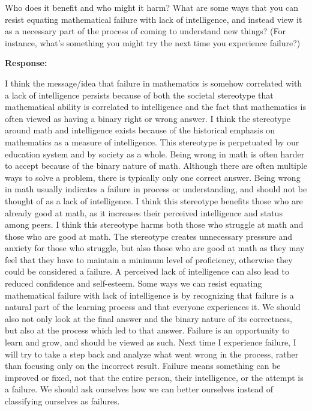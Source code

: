 \documentclass[12pt]{article} %
\numberwithin{equation}{section}
\begin{document}
\begin{enumerate}[label = (\alph*)]
            Who does it benefit and who might it harm?
            What are some ways that you can resist equating mathematical failure with lack of intelligence, and instead view it as a necessary part of the process of coming to understand new things?
            (For instance, what's something you might try the next time you experience failure?)\par
            \smallskip
            \hspace{0.5em}
            \textbf{Response:}\par
            \indent I think the message/idea that failure in mathematics is somehow correlated with a lack of intelligence persists because of both the societal stereotype that mathematical ability is correlated to intelligence and the fact that mathematics is often viewed as having a binary right or wrong answer.
            I think the stereotype around math and intelligence exists because of the historical emphasis on mathematics as a measure of intelligence.
            This stereotype is perpetuated by our education system and by society as a whole.
            Being wrong in math is often harder to accept because of the binary nature of math.
            Although there are often multiple ways to solve a problem, there is typically only one correct answer.
            Being wrong in math usually indicates a failure in process or understanding, and should not be thought of as a lack of intelligence.
            I think this stereotype benefits those who are already good at math, as it increases their perceived intelligence and status among peers.
            I think this stereotype harms both those who struggle at math and those who are good at math.
            The stereotype creates unnecessary pressure and anxiety for those who struggle, but also those who are good at math as they may feel that they have to maintain a minimum level of proficiency, otherwise they could be considered a failure.
            A perceived lack of intelligence can also lead to reduced confidence and self-esteem.
            Some ways we can resist equating mathematical failure with lack of intelligence is by recognizing that failure is a natural part of the learning process and that everyone experiences it.
            We should also not only look at the final answer and the binary nature of its correctness, but also at the process which led to that answer.
            Failure is an opportunity to learn and grow, and should be viewed as such.
            Next time I experience failure, I will try to take a step back and analyze what went wrong in the process, rather than focusing only on the incorrect result.
            Failure means something can be improved or fixed, not that the entire person, their intelligence, or the attempt is a failure.
            We should ask ourselves how we can better ourselves instead of classifying ourselves as failures.
\pagebreak[3]
    \end{enumerate}
\end{document}
